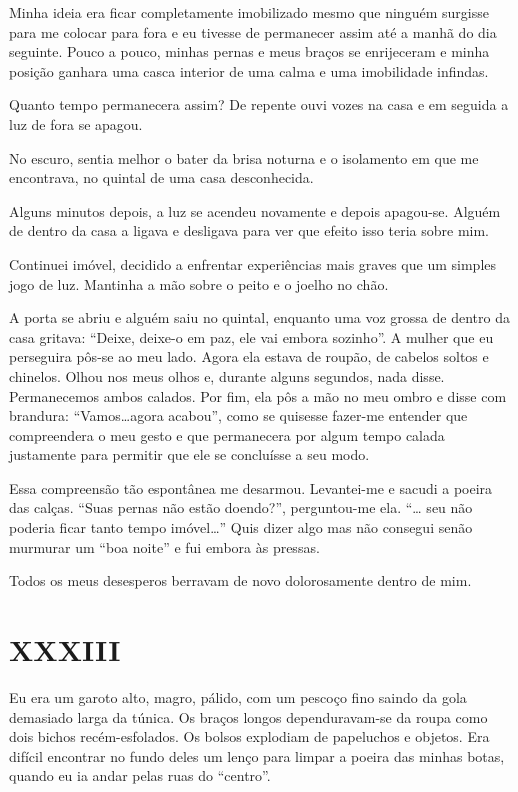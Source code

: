 Minha ideia era ficar completamente imobilizado mesmo que ninguém surgisse para me colocar para fora e eu tivesse de permanecer assim até a manhã do dia seguinte. Pouco a pouco, minhas pernas e meus braços se enrijeceram e minha posição ganhara uma casca interior de uma calma e uma imobilidade infindas.

Quanto tempo permanecera assim? De repente ouvi vozes na casa e em seguida a luz de fora se apagou.

No escuro, sentia melhor o bater da brisa noturna e o isolamento em que me encontrava, no quintal de uma casa desconhecida.

Alguns minutos depois, a luz se acendeu novamente e depois apagou-se. Alguém de dentro da casa a ligava e desligava para ver que efeito isso teria sobre mim.

Continuei imóvel, decidido a enfrentar experiências mais graves que um simples jogo de luz. Mantinha a mão sobre o peito e o joelho no chão.

A porta se abriu e alguém saiu no quintal, enquanto uma voz grossa de dentro da casa gritava: ``Deixe, deixe-o em paz, ele vai embora sozinho''. A mulher que eu perseguira pôs-se ao meu lado. Agora ela estava de roupão, de cabelos soltos e chinelos. Olhou nos meus olhos e, durante alguns segundos, nada disse. Permanecemos ambos calados. Por fim, ela pôs a mão no meu ombro e disse com brandura: ``Vamos\dots agora acabou'', como se quisesse fazer-me entender que compreendera o meu gesto e que permanecera por algum tempo calada justamente para permitir que ele se concluísse a seu modo.

Essa compreensão tão espontânea me desarmou. Levantei-me e sacudi a poeira das calças. ``Suas pernas não estão doendo?'', perguntou-me ela. ``… seu não poderia ficar tanto tempo imóvel\dots'' Quis dizer algo mas não consegui senão murmurar um ``boa noite'' e fui embora às pressas.

Todos os meus desesperos berravam de novo dolorosamente dentro de mim.


\chapter*{\centering\Large{XXXIII}}

Eu era um garoto alto, magro, pálido, com um pescoço fino saindo da gola demasiado larga da túnica. Os braços longos dependuravam-se da roupa como dois bichos recém-esfolados. Os bolsos explodiam de papeluchos e objetos. Era difícil encontrar no fundo deles um lenço para limpar a poeira das minhas botas, quando eu ia andar pelas ruas do ``centro''.

